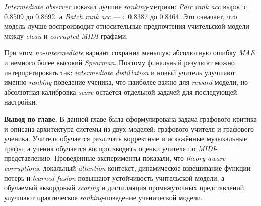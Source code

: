 \documentclass[a4paper,12pt]{extarticle}
\begin{document}
\begin{table}[htbp]
\caption{Финальное сравнение \textit{observer}-конфигураций}
\label{tab:observer-final-comparison}
\centering
\scriptsize
{}
\end{table}

\textit{Intermediate observer} показал лучшие \textit{ranking}-метрики: \textit{Pair rank acc} вырос с 0.8509 до 0.8692, а \textit{Batch rank acc} --- с 0.8387 до 0.8464. Это означает, что модель лучше воспроизводит относительные предпочтения учительской модели между \textit{clean} и \textit{corrupted MIDI}-графами.

При этом \textit{no-intermediate} вариант сохранил меньшую абсолютную ошибку \textit{MAE} и немного более высокий \textit{Spearman}. Поэтому финальный результат можно интерпретировать так: \textit{intermediate distillation} и новый учитель улучшают именно \textit{ranking}-поведение ученика, что наиболее важно для \textit{reward}-модели, но абсолютная калибровка \textit{score} остаётся отдельной задачей для последующей настройки.


\textbf{Вывод по главе.} В данной главе была сформулирована задача графового критика и описана архитектура системы из двух моделей: графового учителя и графового ученика. Учитель обучается различать корректные и искажённые музыкальные графы, а ученик обучается воспроизводить оценки учителя по \textit{MIDI}-представлению. Проведённые эксперименты показали, что \textit{theory-aware corruptions}, локальный \textit{attention}-контекст, динамическое взвешивание функции потерь и \textit{learned fusion} повышают устойчивость учительской модели, а обучаемый аккордовый \textit{scoring} и дистилляция промежуточных представлений улучшают практическое \textit{ranking}-поведение ученической модели.
\end{document}

